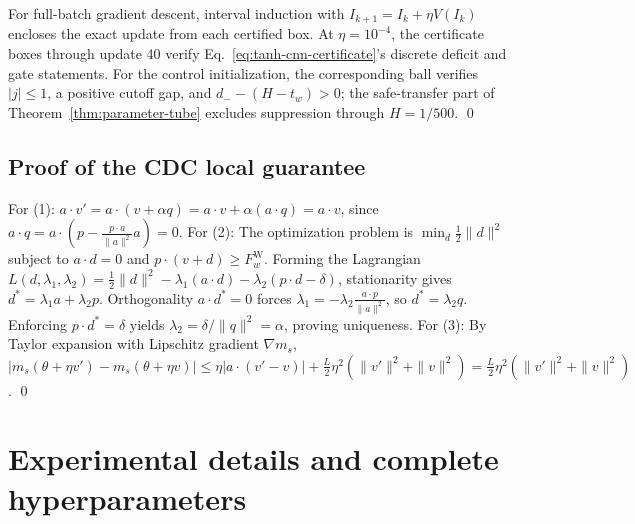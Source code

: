 \documentclass{article}
\theoremstyle{definition}
\theoremstyle{remark}
\newcommand{\Wcond}{\mathrm{W}}
\begin{document}
For full-batch gradient descent, interval induction with $I_{k+1}=I_k+\eta V(I_k)$ encloses the exact update from each certified box. At $\eta=10^{-4}$, the certificate boxes through update 40 verify Eq.~\eqref{eq:tanh-cnn-certificate}'s discrete deficit and gate statements. For the control initialization, the corresponding ball verifies $|j|\le1$, a positive cutoff gap, and $d_--(H-t_w)>0$; the safe-transfer part of Theorem~\ref{thm:parameter-tube} excludes suppression through $H=1/500$. \qed

\subsection{Proof of the CDC local guarantee}
\label{app:proof-thm-cdc}
For (1): $a \cdot v' = a \cdot (v + \alpha q) = a \cdot v + \alpha (a \cdot q) = a \cdot v$, since $a \cdot q = a \cdot (p - \frac{p \cdot a}{\|a\|^2} a) = 0$.
For (2): The optimization problem is $\min_d \frac12 \|d\|^2$ subject to $a \cdot d = 0$ and $p \cdot (v + d) \ge F_w^{\Wcond}$. Forming the Lagrangian $L(d, \lambda_1, \lambda_2) = \frac12 \|d\|^2 - \lambda_1 (a \cdot d) - \lambda_2 (p \cdot d - \delta)$, stationarity gives $d^* = \lambda_1 a + \lambda_2 p$. Orthogonality $a \cdot d^* = 0$ forces $\lambda_1 = -\lambda_2 \frac{a \cdot p}{\|a\|^2}$, so $d^* = \lambda_2 q$. Enforcing $p \cdot d^* = \delta$ yields $\lambda_2 = \delta / \|q\|^2 = \alpha$, proving uniqueness.
For (3): By Taylor expansion with Lipschitz gradient $\nabla m_s$, $|m_s(\theta + \eta v') - m_s(\theta + \eta v)| \le \eta |a \cdot (v' - v)| + \frac{L}{2} \eta^2 (\|v'\|^2 + \|v\|^2) = \frac{L}{2} \eta^2 (\|v'\|^2 + \|v\|^2)$. \qed

\section{Experimental details and complete hyperparameters}
\label{app:experimental-details}
\setcounter{equation}{0}
\setcounter{theorem}{0}
\setcounter{table}{0}
\setcounter{figure}{0}
\end{document}
